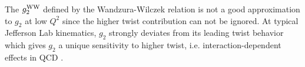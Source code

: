 The $g_2^{\mathrm{WW}}$ defined by the Wandzura-Wilczek relation is not a good approximation to $g_2$ at low $Q^2$ since the higher twist contribution can not be ignored. At typical Jefferson Lab kinematics, $g_2$ strongly deviates from its leading twist behavior which gives $g_2$ a unique sensitivity to higher twist, i.e. interaction-dependent effects in QCD \cite{Jaffe1990}.

